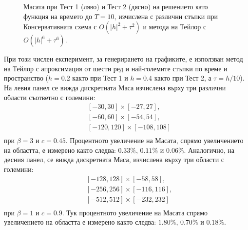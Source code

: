 \documentclass[a4paper]{article}
\theoremstyle{remark}
\begin{document}
\begin{large}
\begin{figure}[ht]
\begin{minipage}[b]{0.51\linewidth}
	\end{minipage}
\caption{Масата при Тест 1 (ляво) и Тест 2 (дясно) на решението като функция на времето до $T=10$, изчислена с различни стъпки при Консервативната схема с $O(|h|^2 + \tau^2)$ и метода на Тейлор с $O(|h|^6 + \tau^6)$.}
\label{Test2TEnMany}
\end{figure}
\FloatBarrier
При този числен експеримент, за генерирането на графиките, е използван метод на Тейлор с апроксимация от шести ред и най-големите стъпки по време и пространство ($h=0.2$ както при Тест 1 и $h=0.4$ както при Тест 2, а $\tau =  h/10$). На левия панел се вижда дискретната Маса изчислена върху три различни области съответно с големини:
\noindent 
\begin{equation*}
\begin{split}
& [-30, 30] \times [-27, 27], \nonumber\\
& [-60, 60] \times [-54, 54], \nonumber\\
& [-120, 120] \times [-108, 108] \nonumber\\
\end{split}
\end{equation*} 
\noindent 
при $\beta =  3$ и $c = 0.45$. Процентното увеличение на Масата, спрямо увеличението на областта, е измерено както следва: $0.33\%$, $0.11\%$ и $0.06\%$. Аналогично, на десния панел, се вижда дискретната Маса, изчислена върху три области с големини:
\noindent 
\begin{equation*}
\begin{split}
& [-128, 128] \times [-58, 58], \nonumber\\
& [-256, 256] \times [-116, 116], \nonumber\\
& [-512, 512] \times [-232, 232] \nonumber\\
\end{split}
\end{equation*} 
\noindent 
при $\beta =  1$ и $c = 0.9$. Тук процентното увеличение на Масата спрямо увеличението на областта е измерено както следва: $1.80\%$, $0.70\%$ и $0.18\%$. 


\end{large}
\end{document}
